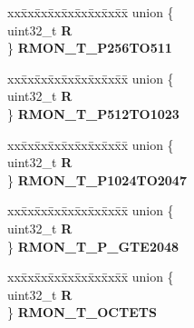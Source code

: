 \begin{DoxyCompactItemize}
\begin{tabbing}
\end{tabbing}\item 
\mbox{\label{structFEC__tag_a49665944178c4d443b086e23e20e2d52}} 
\begin{tabbing}
xx\=xx\=xx\=xx\=xx\=xx\=xx\=xx\=xx\=\kill
union \{\\
\>uint32\_t {\bfseries R}\\
\} {\bfseries RMON\_T\_P256TO511}\\

\end{tabbing}\item 
\mbox{\label{structFEC__tag_adb9094877c33381fcb31d241b92155ec}} 
\begin{tabbing}
xx\=xx\=xx\=xx\=xx\=xx\=xx\=xx\=xx\=\kill
union \{\\
\>uint32\_t {\bfseries R}\\
\} {\bfseries RMON\_T\_P512TO1023}\\

\end{tabbing}\item 
\mbox{\label{structFEC__tag_a673a90eddf2cc527ae846c9d4eb51260}} 
\begin{tabbing}
xx\=xx\=xx\=xx\=xx\=xx\=xx\=xx\=xx\=\kill
union \{\\
\>uint32\_t {\bfseries R}\\
\} {\bfseries RMON\_T\_P1024TO2047}\\

\end{tabbing}\item 
\mbox{\label{structFEC__tag_a0544c4abd35aff46acd4b05d684c0363}} 
\begin{tabbing}
xx\=xx\=xx\=xx\=xx\=xx\=xx\=xx\=xx\=\kill
union \{\\
\>uint32\_t {\bfseries R}\\
\} {\bfseries RMON\_T\_P\_GTE2048}\\

\end{tabbing}\item 
\mbox{\label{structFEC__tag_acd34e0e74f950c0b1a324e7343c70159}} 
\begin{tabbing}
xx\=xx\=xx\=xx\=xx\=xx\=xx\=xx\=xx\=\kill
union \{\\
\>uint32\_t {\bfseries R}\\
\} {\bfseries RMON\_T\_OCTETS}\\


\end{tabbing}
\end{DoxyCompactItemize}
